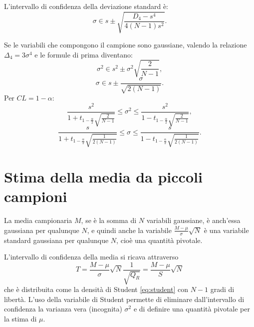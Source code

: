 L'intervallo di confidenza della deviazione standard è:
\begin{equation}
\sigma \in s\pm \sqrt { \frac { D_{ 4 }-s^{ 4 } }{ 4\left( N-1 \right) { s }^{ 2 } }  } .
\end{equation}

Se le variabili che compongono il campione sono gaussiane, valendo la relazione $\Delta_4=3\sigma^4$ e le formule di prima diventano:
\begin{equation}
\sigma ^{ 2 }\in s^{ 2 }\pm \sigma ^{ 2 }\sqrt { \frac { 2 }{ N-1 }  } ,
\end{equation}
\begin{equation}
\sigma \in s\pm \frac { \sigma  }{ \sqrt { 2\left( N-1 \right)  }  }.
\end{equation}
Per $CL=1-\alpha$:
\begin{equation}
\label{eq:stima-var-var-gauss-grandi}
\frac { s^{ 2 } }{ 1+t_{ 1-\frac { \alpha  }{ 2 }  }\sqrt { \frac { 2 }{ N-1 }  }  } \le \sigma ^{ 2 }\le \frac { s^{ 2 } }{ 1-t_{ 1-\frac { \alpha  }{ 2 }  }\sqrt { \frac { 2 }{ N-1  }  }  },
\end{equation}
\begin{equation}
\label{eq:stima-var-dev-gauss-grandi}
\frac { s }{ 1+t_{ 1-\frac { \alpha  }{ 2 }  }\sqrt { \frac { 1 }{ 2\left( N-1 \right)  }  }  } \le \sigma \le \frac { s }{ 1-t_{ 1-\frac { \alpha  }{ 2 }  }\sqrt { \frac { 1 }{ 2\left( N-1 \right)  }  }  } .
\end{equation}

\section{Stima della media da piccoli campioni} %
\label{sec:stima-media-piccoli}
La media campionaria $M$, se è la somma di $N$ variabili gaussiane, è anch'essa gaussiana per qualunque $N$, e quindi anche la variabile $\frac { M-\mu  }{ \sigma  } \sqrt { N } $ è una variabile standard gaussiana per qualunque $N$, cioè una quantità pivotale.

L'intervallo di confidenza della media si ricava attraverso
\begin{equation}
T=\frac { M-\mu  }{ \sigma  } \sqrt { N } \frac { 1 }{ \sqrt { { Q }_{ R } }  } =\frac { M-\mu  }{ S } \sqrt { N }
\end{equation}
che è distribuita come la densità di Student \ref{eq:student} con $N-1$ gradi di libertà. L'uso della variabile di Student permette di eliminare dall'intervallo di confidenza la varianza vera (incognita) $\sigma^2$ e di definire una quantità pivotale per la stima di $\mu$.

